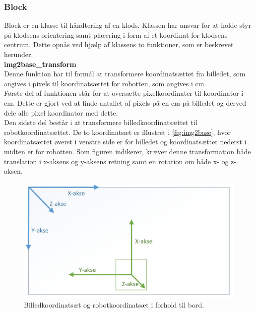\subsubsection{Block} %
\label{subsub:block}

Block er en klasse til håndtering af en klods. Klassen har ansvar for at holde styr på klodsens orientering samt placering i form af et koordinat for klodsens centrum. Dette opnås ved hjælp af klassens to funktioner, som er beskrevet herunder. \\

\textbf{img2base\_transform} \\
Denne funktion har til formål at transformere koordinatsættet fra billedet, som angives i pixels til koordinatsættet for robotten, som angives i cm.\\

Første del af funktionen står for at oversætte pixelkoordinater til koordinator i cm. Dette er gjort ved at finde antallet af pixels på en cm på billedet og derved dele alle pixel koordinator med dette. \\

Den sidste del består i at transformere billedkoordinatsættet til robotkoordinatsættet. De to koordinatsæt er illustret i \autoref{fig:img2base}, hvor koordinatsættet øverst i venstre side er for billedet og koordinatsættet nederst i midten er for robotten. Som figuren indikerer, kræver denne transformation både translation i x-aksens og y-aksens retning samt en rotation om både x- og z-aksen. \\


\begin{figure}[H]
\centering
\includegraphics[scale=0.4]{images/img2base}
\caption{Billedkoordinatsæt og robotkoordinatsæt i forhold til bord.}
\label{fig:img2base}
\end{figure}

